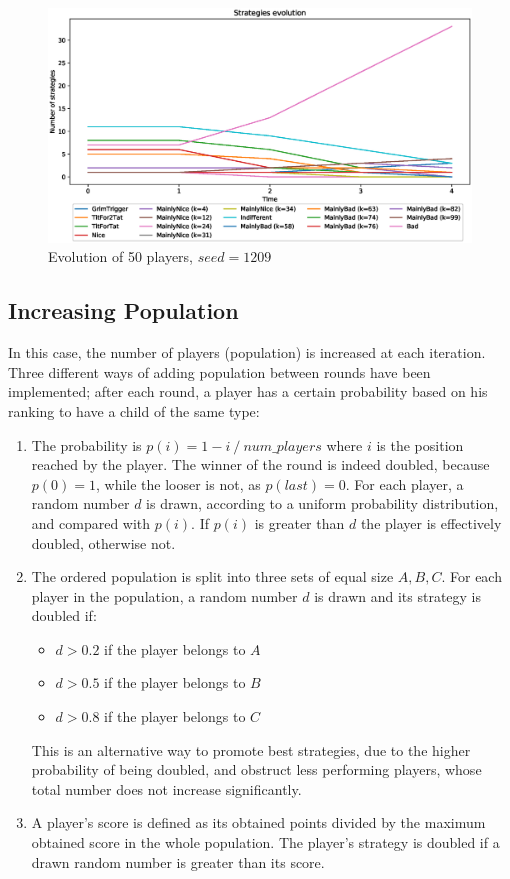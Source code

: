 \documentclass[journal,10pt,twoside]{IEEEtran}
\begin{document}
\begin{figure}[!ht]
    \centering
    \includegraphics[width=1\columnwidth]{../img/ripdmp-const/seed1209/ripdmp-evolution-const-pop-50}
    \caption{Evolution of 50 players, $seed = 1209$}
    \label{fig:constRseed1209}
\end{figure}

\subsection{Increasing Population} \label{ss:rIPDMPi}
In this case, the number of players (population) is increased at each iteration. Three different ways of adding population between rounds have been implemented; after each round, a player has a certain probability based on his ranking to have a child of the same type:
\begin{enumerate}
    \item The probability is $p(i)=1- i\ /\ num\_players$ where $i$ is the position reached by the player. The winner of the round is indeed doubled, because $p(0)=1$, while the looser is not, as $p(last)=0$.
    For each player, a random number $d$ is drawn, according to a uniform probability distribution, and compared with $p(i)$. If $p(i)$ is greater than $d$ the player is effectively doubled, otherwise not.
    \item The ordered population is split into three sets of equal size $A,B,C$. For each player in the population, a random number $d$ is drawn and its strategy is doubled if:
    \begin{itemize}
        \item $d>0.2$ if the player belongs to $A$
        \item $d>0.5$ if the player belongs to $B$
        \item $d>0.8$ if the player belongs to $C$
    \end{itemize}
    This is an alternative way to promote best strategies, due to the higher probability of being doubled, and obstruct less performing players, whose total number does not increase significantly.
    \item A player's score is defined as its obtained points divided by the maximum obtained score in the whole population. The player's strategy is doubled if a drawn random number is greater than its score.
\end{enumerate}
\end{document}
